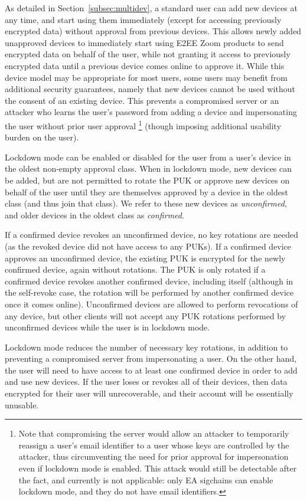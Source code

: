 As detailed in Section~\ref{subsec:multidev}, a standard user can add new devices at any time, and
start using them immediately (except for accessing previously encrypted data) without approval from
previous devices. This allows newly added unapproved devices to immediately start using E2EE Zoom
products to send encrypted data on behalf of the user, while not granting it access to previously
encrypted data until a previous device comes online to approve it. While this device model may be
appropriate for most users, some users may benefit from additional security guarantees, namely that
new devices cannot be used without the consent of an existing device. This prevents a compromised
server or an attacker who learns the user's password from adding a device and impersonating the user
without prior user approval%
%
\footnote{ Note that compromising the server would allow an attacker to temporarily reassign a
user's email identifier to a user whose keys are controlled by the attacker, thus circumventing the
need for prior approval for impersonation even if lockdown mode is enabled. This attack would still
be detectable after the fact, and currently is not applicable: only EA sigchains can enable lockdown
mode, and they do not have email identifiers.}%
%
(though imposing additional usability burden on the user).

Lockdown mode can be enabled or disabled for the user from a user's device in the oldest non-empty
approval class. When in lockdown mode, new devices can be added, but are not permitted to rotate the
PUK or approve new devices on behalf of the user until they are themselves approved by a device in
the oldest class (and thus join that class). We refer to these new devices as \textit{unconfirmed},
and older devices in the oldest class as \textit{confirmed}.

If a confirmed device revokes an unconfirmed device, no key rotations are needed (as the revoked
device did not have access to any PUKs). If a confirmed device approves an unconfirmed device, the
existing PUK is encrypted for the newly confirmed device, again without rotations. The PUK is only
rotated if a confirmed device revokes another confirmed device, including itself (although in the
self-revoke case, the rotation will be performed by another confirmed device once it comes online).
Unconfirmed devices are allowed to perform revocations of any device, but other clients will not
accept any PUK rotations performed by unconfirmed devices while the user is in lockdown mode.

Lockdown mode reduces the number of necessary key rotations, in addition to preventing a compromised
server from impersonating a user. On the other hand, the user will need to have access to at least
one confirmed device in order to add and use new devices. If the user loses or revokes all of their
devices, then data encrypted for their user will unrecoverable, and their account will be
essentially unusable.

